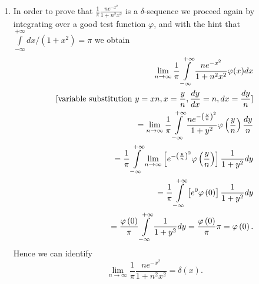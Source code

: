 {\begin{enumerate}
 \item
In order to prove that $\frac{1}{\pi} \frac{n  e^{-x^2}}{1+n^2x^2} $ is  a  $\delta$-sequence
we proceed again by integrating over a good test function $\varphi$,
and with the hint that $\int\limits_{-\infty}^{+\infty} dx/ (1+x^2) =\pi$ we obtain
 \begin{equation}
\begin{split}
\lim_{n \rightarrow \infty}  \frac{1}{\pi}
\int\limits_{-\infty}^{+\infty}
\frac{n  e^{-x^2}}{1+n^2x^2}
   \varphi(x)
dx
\\  \textrm{[variable substitution }    y={xn} , x={y\over n}, {dy\over dx}={n}, dx={dy\over n}
\textrm{]}
\\   =
\lim_{n \rightarrow \infty}   \frac{1}{\pi}
\int\limits_{-\infty}^{+\infty}
\frac{n  e^{-\left( \frac{y}{n} \right)^2}}{1+y^2}
   \varphi \left( \frac{y}{n} \right)
\frac{dy}{n}
\\  =
\frac{1}{\pi}
\int\limits_{-\infty}^{+\infty}
\lim_{n \rightarrow \infty}  \left[     e^{-\left( \frac{y}{n} \right)^2}  \varphi \left( \frac{y}{n} \right) \right]
\frac{1}{1+y^2}
dy
\\   =       \frac{1}{\pi}
\int\limits_{-\infty}^{+\infty}
\left[     e^{0}  \varphi \left( 0\right) \right]
\frac{1}{1+y^2}
dy
\\   =    \frac{\varphi \left( 0\right)}{\pi}
\int\limits_{-\infty}^{+\infty}
\frac{1}{1+y^2}
dy   =
\frac{\varphi \left( 0\right)}{\pi} \pi
   =
\varphi \left( 0\right).
\end{split}
\end{equation}
Hence we can identify
\begin{equation}
   \lim_{n \rightarrow \infty}{\frac{1}{\pi} \frac{n  e^{-x^2}}{1+n^2x^2}}=\delta(x).
\end{equation}


\end{enumerate}}
